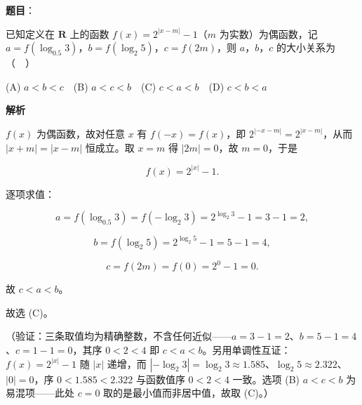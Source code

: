 \begin{answer}

\textbf{题目}：

已知定义在 \(\mathbf{R}\) 上的函数 \(f(x)=2^{|x-m|}-1\)（\(m\) 为实数）为偶函数，记 \(a=f(\log_{0.5}3)\)，\(b=f(\log_2 5)\)，\(c=f(2m)\)，则 \(a\)，\(b\)，\(c\) 的大小关系为（　）

(A) \(a<b<c\)　(B) \(a<c<b\)　(C) \(c<a<b\)　(D) \(c<b<a\)

\textbf{解析}

\(f(x)\) 为偶函数，故对任意 \(x\) 有 \(f(-x)=f(x)\)，即 \(2^{|-x-m|}=2^{|x-m|}\)，从而 \(|x+m|=|x-m|\) 恒成立。取 \(x=m\) 得 \(|2m|=0\)，故 \(m=0\)，于是

\nopagebreak[4]
\[
f(x)=2^{|x|}-1.
\]

逐项求值：

\nopagebreak[4]
\[
a=f(\log_{0.5}3)=f(-\log_2 3)=2^{\log_2 3}-1=3-1=2,
\]

\nopagebreak[4]
\[
b=f(\log_2 5)=2^{\log_2 5}-1=5-1=4,
\]

\nopagebreak[4]
\[
c=f(2m)=f(0)=2^0-1=0.
\]

故 \(c<a<b\)。

故选 (C)。

（验证：三条取值均为精确整数，不含任何近似——\(a=3-1=2\)、\(b=5-1=4\)、\(c=1-1=0\)，其序 \(0<2<4\) 即 \(c<a<b\)。另用单调性互证：\(f(x)=2^{|x|}-1\) 随 \(|x|\) 递增，而 \(|-\log_2 3|=\log_2 3\approx 1.585\)、\(\log_2 5\approx 2.322\)、\(|0|=0\)，序 \(0<1.585<2.322\) 与函数值序 \(0<2<4\) 一致。选项 (B) \(a<c<b\) 为易混项——此处 \(c=0\) 取的是最小值而非居中值，故取 (C)。）


\end{answer}
